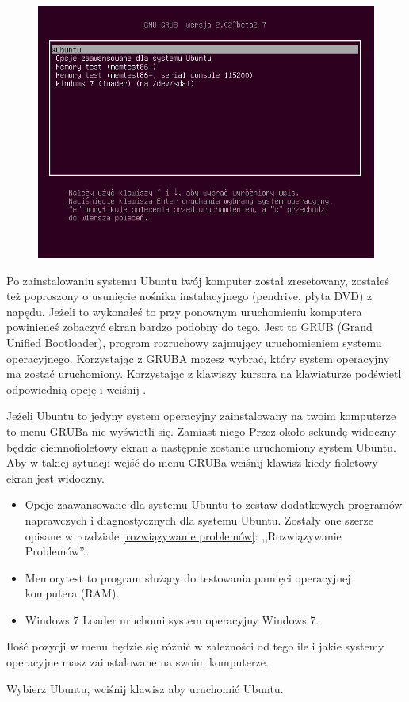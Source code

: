 \label{pierwsze_uruchomienie}
\begin{figure}
                \includegraphics[width=\linewidth]{images/pierwsze_uruchomienie_grub.png}
\end{figure}

Po zainstalowaniu systemu Ubuntu twój komputer został zresetowany, zostałeś też poproszony o usunięcie nośnika instalacyjnego (pendrive, płyta DVD) z napędu. Jeżeli to wykonałeś to przy ponownym uruchomieniu komputera powinieneś zobaczyć ekran bardzo podobny do tego. Jest to GRUB (\textcolor{ubuntu_orange}{Grand Unified Bootloader}), program rozruchowy zajmujący uruchomieniem systemu operacyjnego. Korzystając z GRUBA możesz wybrać, który system operacyjny ma zostać uruchomiony. Korzystając z klawiszy kursora na klawiaturze podświetl odpowiednią opcję i wciśnij \keys{\returnwin}.

Jeżeli Ubuntu to jedyny system operacyjny zainstalowany na twoim komputerze to menu GRUBa nie wyświetli się. Zamiast niego Przez około sekundę widoczny będzie ciemnofioletowy ekran a następnie zostanie uruchomiony system Ubuntu. Aby w takiej sytuacji wejść do menu GRUBa wciśnij klawisz  kiedy fioletowy ekran jest widoczny.

\begin{itemize}
\item \textcolor{ubuntu_orange}{Opcje zaawansowane dla systemu Ubuntu} to zestaw dodatkowych programów naprawczych i diagnostycznych dla systemu Ubuntu. Zostały one szerze opisane w rozdziale \ref{rozwiązywanie problemów}: ,,Rozwiązywanie Problemów''.
\item \textcolor{ubuntu_orange}{Memorytest} to program służący do testowania pamięci operacyjnej komputera (RAM).
\item \textcolor{ubuntu_orange}{Windows 7 Loader} uruchomi system operacyjny Windows 7.
\end{itemize}

Ilość pozycji w menu będzie się różnić w zależności od tego ile i jakie systemy operacyjne masz zainstalowane na swoim komputerze.

\begin{flushright}
Wybierz \textcolor{ubuntu_orange}{Ubuntu}, wciśnij klawisz \keys{\returnwin} aby uruchomić Ubuntu.
\end{flushright}
\clearpage
